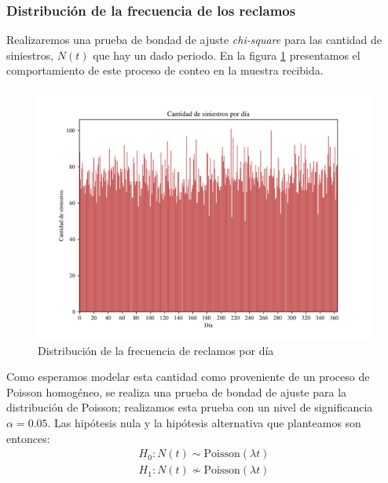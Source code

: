 \documentclass[journal]{IEEEtran}
\begin{document}
            \subsubsection{Distribución de la frecuencia de los reclamos}
            
                Realizaremos una prueba de bondad de ajuste \textit{chi-square} para las cantidad de siniestros, $N(t)$ que hay un dado periodo. En la figura \ref{img:claims_per_day} presentamos el comportamiento de este proceso de conteo en la muestra recibida. 
            
                \begin{figure}[!htbp]
                    \centering
                    \includegraphics[scale=0.42]{img/claims_per_day.png}
                    \caption{Distribución de la frecuencia de reclamos por día}
                    \label{img:claims_per_day}
                \end{figure}

                Como esperamos modelar esta cantidad como proveniente de un proceso de Poisson homogéneo, se realiza una prueba de bondad de ajuste para la distribución de Poisson; realizamos esta prueba con un nivel de significancia $\alpha = 0.05$. Las hipótesis nula y la hipótesis alternativa que planteamos son entonces:
                \begin{gather*}
                    H_0: N(t) \sim \text{Poisson}(\lambda t) \\
                    H_1 : N(t) \not \sim \text{Poisson}(\lambda t)
                \end{gather*}
\end{document}
